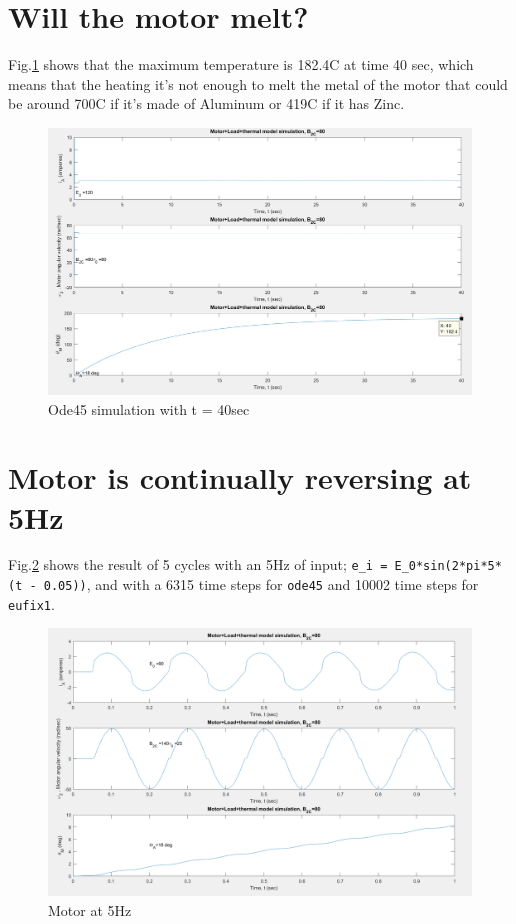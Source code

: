 \documentclass[]{article}
\begin{document}
\section{Will the motor melt?}
Fig.\ref{fig:melt} shows that the maximum temperature is 182.4\degree C at time 40 sec, which means that the heating it's not enough to melt the metal of the motor that could be around 700\degree C if it's made of Aluminum or 419\degree C if it has Zinc. 

\begin{figure}
	\centering
	\includegraphics[width=1\linewidth]{melt}
	\caption{Ode45 simulation with t = 40sec}
	\label{fig:melt}
\end{figure}

\section{Motor is continually reversing at 5Hz}
Fig.\ref{fig:reversing} shows the result of 5 cycles with an 5Hz of input; \verb|e_i = E_0*sin(2*pi*5*(t - 0.05))|, and with a 6315 time steps for \verb|ode45| and 10002 time steps for \verb|eufix1|.
\begin{figure}
	\centering
	\includegraphics[width=1\linewidth]{reversing}
	\caption{Motor at 5Hz}
	\label{fig:reversing}
\end{figure}
\end{document}

